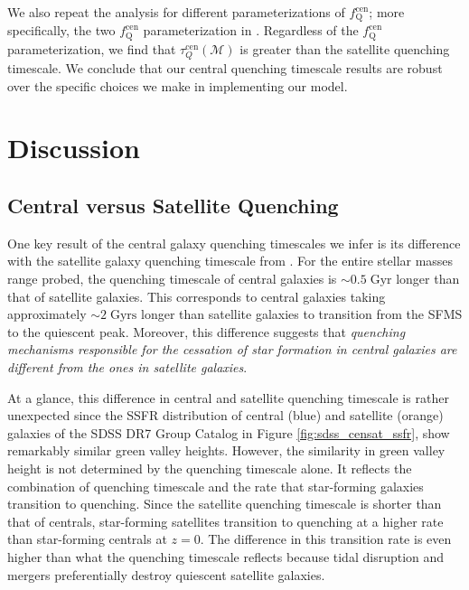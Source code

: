 \documentclass[iop,apj,tighten,twocolappendix,numberedappendix]{emulateapj}
\newcommand{\fqcen}{f_\mathrm{Q}^\mathrm{cen}}
\begin{document}
We also repeat the analysis for different parameterizations of 
$\fqcen$; more specifically, the two $\fqcen$ parameterization 
in \cite{Wetzel:2013aa}. Regardless of the $\fqcen$ 
parameterization, we find that $\tau^\mathrm{cen}_Q(\mathcal{M})$ is 
greater than the satellite quenching timescale. We conclude that 
our central quenching timescale results are robust over the specific 
choices we make in implementing our model.

\section{Discussion} \label{sec:discussion}
\subsection{Central versus Satellite Quenching}
One key result of the central galaxy quenching timescales we infer 
is its difference with the satellite galaxy quenching timescale from 
\cite{Wetzel:2013aa}. For the entire stellar masses range probed, 
the quenching timescale of central galaxies is $\sim 0.5\;\mathrm{Gyr}$ 
longer than that of satellite galaxies. This corresponds to central 
galaxies taking approximately $\sim 2 \;\mathrm{Gyrs}$ longer
than satellite galaxies to transition from the SFMS to the quiescent 
peak. Moreover, this difference suggests that {\em quenching 
mechanisms responsible for the cessation of star formation in central 
galaxies are different from the ones in satellite galaxies}. 

At a glance, this difference in central and satellite quenching 
timescale is rather unexpected since the SSFR distribution of
central (blue) and satellite (orange) galaxies of the SDSS DR7 
Group Catalog in Figure \ref{fig:sdss_censat_ssfr}, show remarkably 
similar green valley heights.  
However, the similarity in green valley height is not determined 
by the quenching timescale alone. It reflects the combination 
of quenching timescale and the rate that star-forming galaxies 
transition to quenching. Since the satellite quenching timescale
is shorter than that of centrals, star-forming satellites 
transition to quenching at a higher rate than star-forming 
centrals at $z = 0$. The difference in this transition rate is
even higher than what the quenching timescale reflects because 
tidal disruption and mergers preferentially destroy quiescent 
satellite galaxies.  
\end{document}
